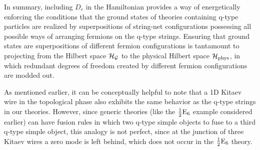 
In summary, including $D_e$ in the Hamiltonian provides a way of energetically enforcing the conditions that the ground states of theories containing q-type particles are realized by superpositions of string-net configurations possessing all possible ways of arranging fermions on the q-type strings. 
Ensuring that ground states are superpositions of different fermion configurations is tantamount to projecting from the Hilbert space $\mathcal{H}_{\mathcal{G}}$ to the physical Hilbert space $\mathcal{H}_{\rm phys}$, in which redundant degrees of freedom created by different fermion configurations are modded out.


As mentioned earlier, it can be conceptually helpful to note that a 1D Kitaev wire in the topological phase also exhibits the same behavior as the q-type strings in our theories.
However, since generic theories (like the $\frac{1}{2}\text{E}_6$ example considered earlier) can have fusion rules in which two q-type simple objects to fuse to a third q-type simple object, this analogy is not perfect, since at the junction of three Kitaev wires a zero mode is left behind, which does not occur in the $\frac{1}{2}\text{E}_6$ theory. 





